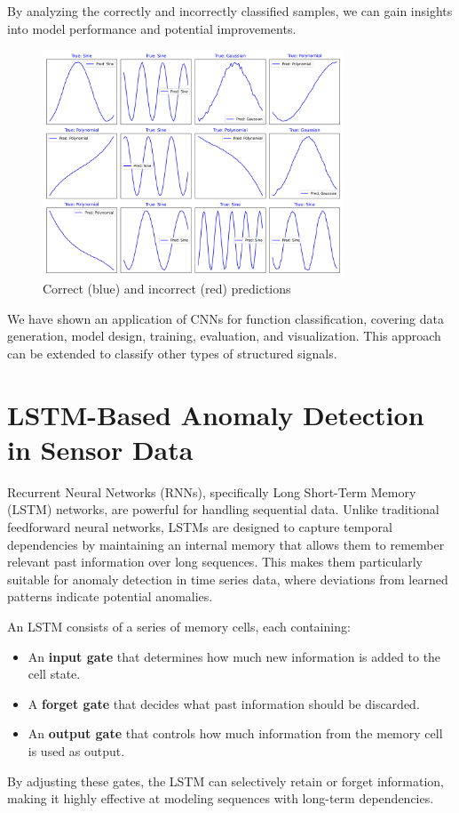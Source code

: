 By analyzing the correctly and incorrectly classified samples, we can gain insights into model performance and potential improvements.

\begin{figure}[ht]
    \centering
    \includegraphics[width=0.8\textwidth]{images/cnn_test_predictions_select.png}
    \caption{Correct (blue) and incorrect (red) predictions}
    \label{fig:test_predictions}
\end{figure}

We have shown an application of CNNs for function classification, covering data generation, model design, training, evaluation, and visualization. This approach can be extended to classify other types of structured signals.

%
\section{LSTM-Based Anomaly Detection in Sensor Data}

Recurrent Neural Networks (RNNs), specifically Long Short-Term Memory (LSTM) networks, are powerful for handling sequential data. Unlike traditional feedforward neural networks, LSTMs are designed to capture temporal dependencies by maintaining an internal memory that allows them to remember relevant past information over long sequences. This makes them particularly suitable for anomaly detection in time series data, where deviations from learned patterns indicate potential anomalies.

An LSTM consists of a series of memory cells, each containing:
\begin{itemize}
    \item An \textbf{input gate} that determines how much new information is added to the cell state.
    \item A \textbf{forget gate} that decides what past information should be discarded.
    \item An \textbf{output gate} that controls how much information from the memory cell is used as output.
\end{itemize}
By adjusting these gates, the LSTM can selectively retain or forget information, making it highly effective at modeling sequences with long-term dependencies.

